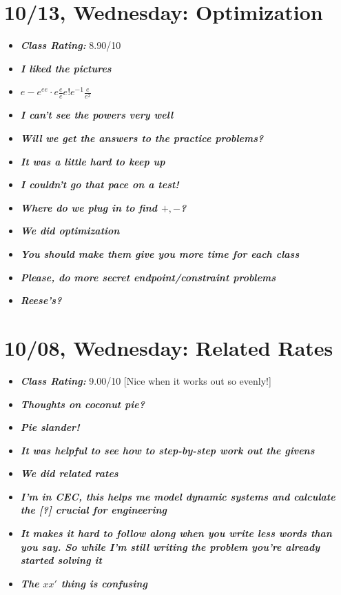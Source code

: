 \documentclass[11pt,letterpaper]{article}
\begin{document}
\newpage
\section*{10/13, Wednesday: Optimization\label{10-13}}

\begin{itemize}
\item {\bfseries\itshape Class Rating:} 8.90/10
\item {\bfseries\itshape I liked the pictures}
\item {\bfseries\itshape $e - e^{ee} \cdot e \frac{e}{e} e! e^{-1} \frac{e}{e^2}$}
\item {\bfseries\itshape I can't see the powers very well}
\item {\bfseries\itshape Will we get the answers to the practice problems?}
\item {\bfseries\itshape It was a little hard to keep up}
\item {\bfseries\itshape I couldn't go that pace on a test!}
\item {\bfseries\itshape Where do we plug in to find $+, -$?}
\item {\bfseries\itshape We did optimization} 
\item {\bfseries\itshape You should make them give you more time for each class} 
\item {\bfseries\itshape Please, do more secret endpoint/constraint problems}
\item {\bfseries\itshape Reese's?}
\end{itemize}

\newpage
\section*{10/08, Wednesday: Related Rates\label{10-08}}

\begin{itemize}
\item {\bfseries\itshape Class Rating:} 9.00/10 [Nice when it works out so evenly!]
\item {\bfseries\itshape Thoughts on coconut pie?}
\item {\bfseries\itshape Pie slander!}
\item {\bfseries\itshape It was helpful to see how to step-by-step work out the givens}
\item {\bfseries\itshape We did related rates}
\item {\bfseries\itshape I'm in CEC, this helps me model dynamic systems and calculate the [?] crucial for engineering}
\item {\bfseries\itshape It makes it hard to follow along when you write less words than you say. So while I'm still writing the problem you're already started solving it}
\item {\bfseries\itshape The $xx'$ thing is confusing}
\end{itemize}
\end{document}
